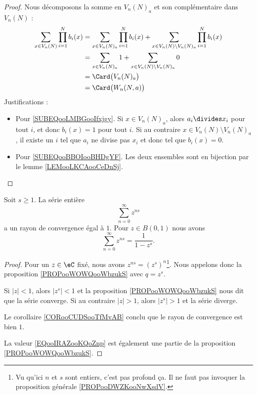 \begin{proof}
    Nous décomposons la somme en \( V_n(N)_a\) et son complémentaire dans \( V_n(N)\) :
    \begin{subequations}
        \begin{align}
        \sum_{x\in V_n(N)}\prod_{i=1}^Nb_i(x)&=\sum_{x\in V_n(N)_a}\prod_{i=1}^Nb_i(x)+\sum_{x\in V_n(N)\setminus V_n(N)_a}\prod_{i=1}^Nb_i(x)\\
        &=\sum_{x\in V_n(N)_a}1+\sum_{x\in V_n(N)\setminus V_n(N)_a}0       \label{SUBEQooLMBGooIfxjgy}\\
        &=\Card\big( V_n(N)_a \big) \\
        &=\Card\big( W_n(N,a) \big)     \label{SUBEQooBBOIooBHDgYF}
        \end{align}
    \end{subequations}
    Justifications :
    \begin{itemize}
        \item Pour \eqref{SUBEQooLMBGooIfxjgy}.
    Si \( x\in V_n(N)_a\), alors \( a_i\divides x_i\) pour tout \( i\), et donc \( b_i(x)=1\) pour tout \( i\). Si au contraire \( x\in V_n(N)\setminus V_n(N)_a\), il existe un \( i\) tel que \( a_i\) ne divise pas \( x_i\) et donc tel que \( b_i(x)=0\).
\item Pour \eqref{SUBEQooBBOIooBHDgYF}. Les deux ensembles sont en bijection par le lemme \ref{LEMooLKCAooCeDnSj}.
    \end{itemize}
\end{proof}

\begin{lemma}       \label{LEMooRJOKooPJGVTr}
    Soit \( s\geq 1\). La série entière
    \begin{equation}
        \sum_{n=0}^{\infty}z^{ns}
    \end{equation}
    a un rayon de convergence égal à \( 1\). Pour \(z\in B(0,1)\) nous avons
    \begin{equation}        \label{EQooIRAZooKQoZnp}
        \sum_{n=0}^{\infty}z^{ns}=\frac{1}{ 1-z^s }.
    \end{equation}
\end{lemma}

\begin{proof}
    Pour un \( z\in \eC\) fixé, nous avons \( z^{ns}=(z^s)^n\)\footnote{Vu qu'ici \( n\) et \( s\) sont entiers, c'est pas profond ça. Il ne faut pas invoquer la proposition générale \ref{PROPooDWZKooNwXsdV}.}. Nous appelons donc la proposition \ref{PROPooWOWQooWbzukS} avec \( q=z^s\).

    Si \( | z |<1\), alors \( | z^s |<1\) et la proposition \ref{PROPooWOWQooWbzukS} nous dit que la série converge. Si au contraire \( | z |>1\), alors \( | z^s |>1\) et la série diverge.

    Le corollaire \ref{CORooCUDSooTfMvAB} conclu que le rayon de convergence est bien \( 1\).

    La valeur \eqref{EQooIRAZooKQoZnp} est également une partie de la proposition \ref{PROPooWOWQooWbzukS}.
\end{proof}


